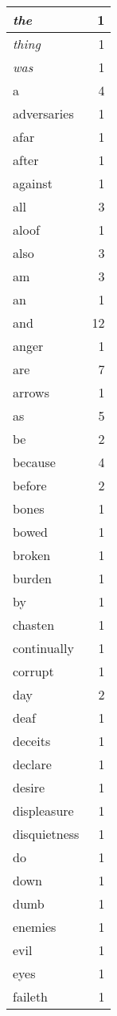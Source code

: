 \begin{center}
\begin{longtable}{l|r}
\emph{the} & 1\\ \hline 
\emph{thing} & 1\\ \hline 
\emph{was} & 1\\ \hline 
a & 4\\ \hline 
adversaries & 1\\ \hline 
afar & 1\\ \hline 
after & 1\\ \hline 
against & 1\\ \hline 
all & 3\\ \hline 
aloof & 1\\ \hline 
also & 3\\ \hline 
am & 3\\ \hline 
an & 1\\ \hline 
and & 12\\ \hline 
anger & 1\\ \hline 
are & 7\\ \hline 
arrows & 1\\ \hline 
as & 5\\ \hline 
be & 2\\ \hline 
because & 4\\ \hline 
before & 2\\ \hline 
bones & 1\\ \hline 
bowed & 1\\ \hline 
broken & 1\\ \hline 
burden & 1\\ \hline 
by & 1\\ \hline 
chasten & 1\\ \hline 
continually & 1\\ \hline 
corrupt & 1\\ \hline 
day & 2\\ \hline 
deaf & 1\\ \hline 
deceits & 1\\ \hline 
declare & 1\\ \hline 
desire & 1\\ \hline 
displeasure & 1\\ \hline 
disquietness & 1\\ \hline 
do & 1\\ \hline 
down & 1\\ \hline 
dumb & 1\\ \hline 
enemies & 1\\ \hline 
evil & 1\\ \hline 
eyes & 1\\ \hline 
faileth & 1\\ \hline 

\end{longtable}
\end{center}
